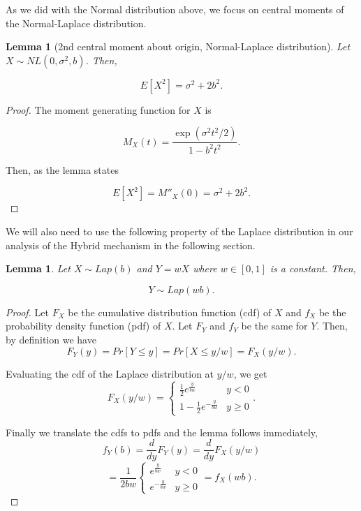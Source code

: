 \documentclass{article}
\theoremstyle{plain}
\newtheorem{lem}[thm]{Lemma}
\begin{document}
As we did with the Normal distribution above, we focus on central moments of the Normal-Laplace distribution.

\begin{lem}[2nd central moment about origin, Normal-Laplace distribution]
\label{nl_secmom}
Let $X \sim NL(0, \sigma^2, b)$. Then, 

$$E[X^2] = \sigma^2 + 2b^2.$$
\end{lem}

\begin{proof}
The moment generating function for $X$ is

$$M_X(t) = \frac{\exp(\sigma^2t^2/2)}{1 - b^2t^2}.$$

Then, as the lemma states

$$E[X^2] = M''_X(0) = \sigma^2 + 2b^2.$$
\end{proof}

We will also need to use the following property of the Laplace distribution in our analysis of the Hybrid mechanism in the following section. 

\begin{lem} \label{wtimeslap}
Let $X \sim Lap(b)$ and $Y = wX$ where $w \in [0,1]$ is a constant. Then, 

$$Y \sim Lap(wb).$$
\end{lem}

\begin{proof}
Let $F_X$ be the cumulative distribution function (cdf) of $X$ and $f_X$ be the probability density function (pdf) of $X$. Let $F_Y$ and $f_Y$ be the same for $Y$. Then, by definition we have 
$$F_Y(y) = Pr[Y \leq y] = Pr[X \leq y/w] = F_X(y/w).$$
	
Evaluating the cdf of the Laplace distribution at $y/w$, we get 
$$F_X(y/w) = 
	\begin{cases} 
      \frac{1}{2}e^{\frac{y}{bw}} & y < 0 \\
      1 - \frac{1}{2}e^{-\frac{y}{bw}} & y \geq 0 
	\end{cases} .$$
	
Finally we translate the cdfs to pdfs and the lemma follows immediately, 
$$f_Y(b) = \frac{d}{dy}F_Y(y) = \frac{d}{dy}F_X(y/w) $$
$$= \frac{1}{2bw}
	\begin{cases} 
      e^{\frac{y}{bw}} & y < 0 \\
      e^{-\frac{y}{bw}} & y \geq 0 
	\end{cases}
     = f_X(wb).$$
\end{proof}
\end{document}

